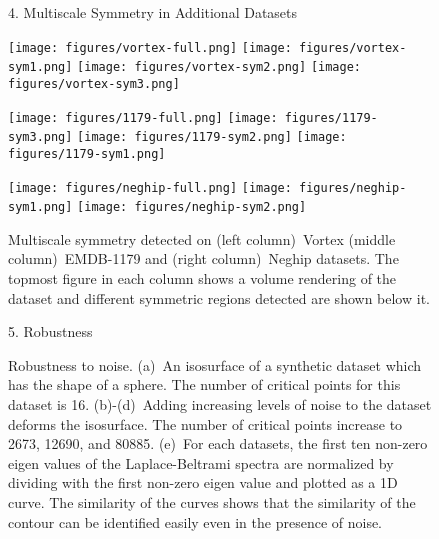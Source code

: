 \documentclass[review,journal]{vgtc}         %
\begin{document}
\begin{figure*}
\centering
{\sffamily\large{4. Multiscale Symmetry in Additional Datasets\\}}
\vspace{0.5cm}
\centering
\begin{minipage}{0.33\textwidth}
	\centering
	\subfigure
	{
		\texttt{[image: figures/vortex-full.png]}
	}
	\subfigure
	{
		\texttt{[image: figures/vortex-sym1.png]}
	}
	\subfigure
	{
		\texttt{[image: figures/vortex-sym2.png]}
	}
	\subfigure
	{
		\texttt{[image: figures/vortex-sym3.png]}
	}
\end{minipage}
\begin{minipage}{0.33\textwidth}
	\centering
	\subfigure
	{
		\texttt{[image: figures/1179-full.png]}
	}
	\subfigure
	{
		\texttt{[image: figures/1179-sym3.png]}
	}
	\subfigure
	{
		\texttt{[image: figures/1179-sym2.png]}
	}
	\subfigure
	{
		\texttt{[image: figures/1179-sym1.png]}
	}
\end{minipage}
\begin{minipage}{0.33\textwidth}
	\subfigure
	{
		\texttt{[image: figures/neghip-full.png]}
	}
	\subfigure
	{
		\texttt{[image: figures/neghip-sym1.png]}
	}
	\subfigure
	{
		\texttt{[image: figures/neghip-sym2.png]}
	}
\end{minipage}
\caption{\label{addres}Multiscale symmetry detected on (left column)~Vortex (middle column)~EMDB-1179 and (right column)~Neghip datasets.
	The topmost figure in each column shows a volume rendering of the dataset and different symmetric regions detected
are shown below it.}
\end{figure*}
\begin{figure*}
	\centering
	{\sffamily\large{5. Robustness\\}}
	\centering
	\caption{Robustness to noise. (a)~An isosurface of a synthetic dataset 
		which has the shape of a sphere. The number of critical points for this dataset
		is 16. (b)-(d)~Adding increasing levels of noise to the dataset deforms the
		isosurface. The number of critical points increase to 2673, 12690, and 80885.  
		(e)~For each datasets, the first ten non-zero eigen values of the Laplace-Beltrami spectra 
		are normalized by dividing with the first non-zero eigen value and plotted as a 1D curve. 
		The similarity of the curves shows that the similarity of the contour can be identified easily even in the presence
		of noise. }
\end{figure*}
\end{document}

